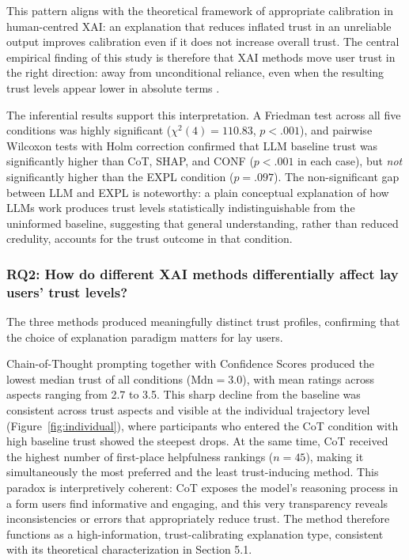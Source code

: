 This pattern aligns with the theoretical framework of appropriate calibration in human-centred XAI: an explanation that reduces inflated trust in an unreliable output improves calibration even if it does not increase overall trust. The central empirical finding of this study is therefore that XAI methods move user trust in the right direction: away from unconditional reliance, even when the resulting trust levels appear lower in absolute terms \cite{zhang_effect_2020}.

The inferential results support this interpretation. A Friedman test across all five
conditions was highly significant ($\chi^2(4) = 110.83$, $p < .001$), and pairwise Wilcoxon
tests with Holm correction confirmed that LLM baseline trust was significantly higher than
CoT, SHAP, and CONF ($p < .001$ in each case), but \emph{not} significantly higher than
the EXPL condition ($p = .097$). The non-significant gap between LLM and EXPL is
noteworthy: a plain conceptual explanation of how LLMs work produces trust levels
statistically indistinguishable from the uninformed baseline, suggesting that general
understanding, rather than reduced credulity, accounts for the trust outcome in that condition.

\subsubsection*{RQ2: How do different XAI methods differentially affect lay users' trust levels?}

The three methods produced meaningfully distinct trust profiles, confirming that the choice of explanation paradigm matters for lay users.

Chain-of-Thought prompting together with Confidence Scores produced the lowest median trust of all conditions ($\text{Mdn} = 3.0$), with mean ratings across aspects ranging from 2.7 to 3.5. This sharp decline from the baseline was consistent across trust aspects and visible at the individual trajectory level (Figure~\ref{fig:individual}), where participants who entered the CoT condition with high baseline trust showed the steepest drops. At the same time, CoT received the highest number of first-place helpfulness rankings ($n = 45$), making it simultaneously the most preferred and the least trust-inducing method. This paradox is interpretively coherent: CoT exposes the model's reasoning process in a form users find informative and engaging, and this very transparency reveals inconsistencies or errors that appropriately reduce trust. The method therefore functions as a high-information, trust-calibrating explanation type, consistent with its theoretical characterization in Section 5.1.

